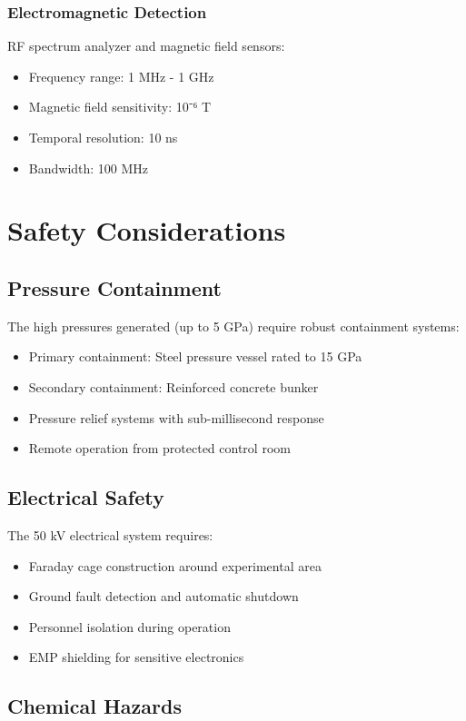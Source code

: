 \documentclass[12pt,a4paper]{article}
\begin{document}
\subsubsection{Electromagnetic Detection}
RF spectrum analyzer and magnetic field sensors:
\begin{itemize}
\item Frequency range: 1 MHz - 1 GHz
\item Magnetic field sensitivity: 10⁻⁶ T
\item Temporal resolution: 10 ns
\item Bandwidth: 100 MHz
\end{itemize}

\section{Safety Considerations}

\subsection{Pressure Containment}

The high pressures generated (up to 5 GPa) require robust containment systems:
\begin{itemize}
\item Primary containment: Steel pressure vessel rated to 15 GPa
\item Secondary containment: Reinforced concrete bunker
\item Pressure relief systems with sub-millisecond response
\item Remote operation from protected control room
\end{itemize}

\subsection{Electrical Safety}

The 50 kV electrical system requires:
\begin{itemize}
\item Faraday cage construction around experimental area
\item Ground fault detection and automatic shutdown
\item Personnel isolation during operation
\item EMP shielding for sensitive electronics
\end{itemize}

\subsection{Chemical Hazards}
\end{document}
